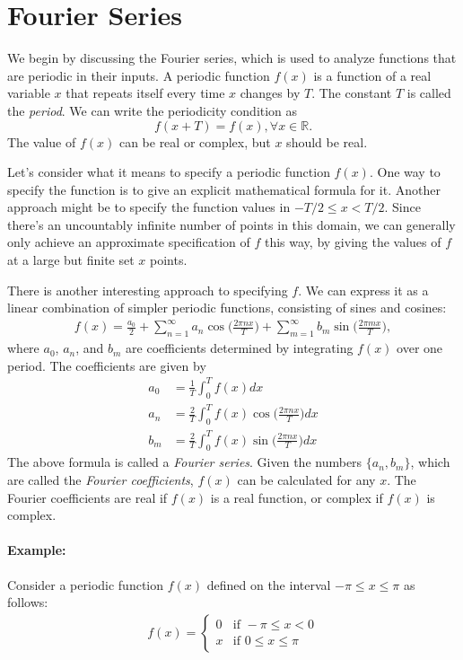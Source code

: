 \section{Fourier Series}
\label{sec:fourier_series}

We begin by discussing the Fourier series, which is used to analyze functions that are periodic in their inputs. A periodic function $f(x)$ is a function of a real variable $x$ that repeats itself every time $x$ changes by $T$. The constant $T$ is called the \textit{period}. We can write the periodicity condition as
$$f(x+T) = f(x), \forall x\in \mathbb{R}.$$
The value of $f(x)$ can be real or complex, but $x$ should be real.

Let's consider what it means to specify a periodic function $f(x)$. One way to specify the function is to give an explicit mathematical formula for it. Another approach might be to specify the function values in $−T/2 \leq x < T/2$. Since there's an uncountably infinite number of points in this domain, we can generally only achieve an approximate specification of $f$ this way, by giving the values of $f$ at a large but finite set $x$ points. 

There is another interesting approach to specifying $f$. We can express it as a linear combination of simpler periodic functions, consisting of sines and cosines:
\begin{align}
	f(x) = \frac{a_0}{2}+\sum_{n=1}^{\infty} a_n \cos\bigg(\frac{2\pi n x}{T}\bigg)+\sum_{m=1}^{\infty}b_m \sin\bigg(\frac{2\pi m x}{T}\bigg),
	\label{eq:fourier_series}
\end{align}
where $a_0$, $a_n$, and $b_m$ are coefficients determined by integrating $f(x)$ over one period. The coefficients are given by
\begin{align*}
	a_0 &= \frac{1}{T}\int_0^Tf(x)dx\\
	a_n	&= \frac{2}{T}\int_0^Tf(x)\cos\bigg(\frac{2\pi nx}{T}\bigg)dx\\
	b_m	&= \frac{2}{T}\int_0^Tf(x)\sin\bigg(\frac{2\pi nx}{T}\bigg)dx
\end{align*}
The above formula is called a \textit{Fourier series}. Given the numbers $\{a_n, b_m\}$, which are called the \textit{Fourier coefficients}, $f(x)$ can be calculated for any $x$. The Fourier coefficients are real if $f(x)$ is a real function, or complex if $f(x)$ is complex.


\paragraph{Example: }Consider a periodic function $f(x)$ defined on the interval $-\pi\leq x \leq\pi$ as follows:
\begin{align*}
f(x)= 
\begin{cases}
	0 & \text{if } -\pi \leq x < 0 \\
	x & \text{if } 0 \leq x \leq \pi
\end{cases}
\end{align*}

